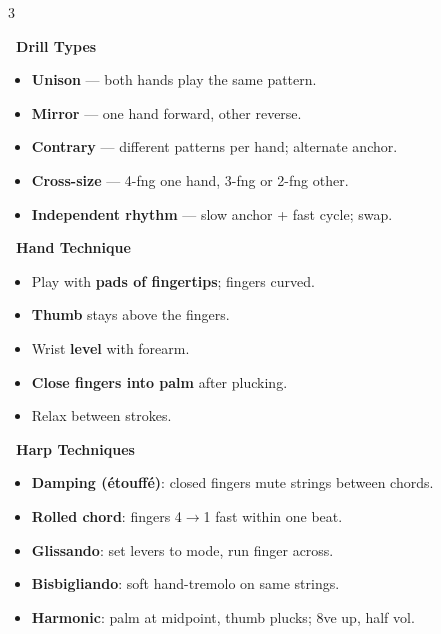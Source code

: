 \documentclass[letterpaper]{article}
\begin{document}
\vspace{3mm}

\fontsize{8.5}{10.5}\selectfont
\setlength{\columnsep}{3mm}
\begin{multicols}{3}

\colorbox{headerbg}{\color{white}\textbf{\ Drill Types\ }}
\vspace{1mm}
\begin{itemize}
\item \textbf{Unison} --- both hands play the same pattern.
\item \textbf{Mirror} --- one hand forward, other reverse.
\item \textbf{Contrary} --- different patterns per hand; alternate anchor.
\item \textbf{Cross-size} --- 4-fng one hand, 3-fng or 2-fng other.
\item \textbf{Independent rhythm} --- slow anchor + fast cycle; swap.
\end{itemize}

\vspace{1.5mm}
\colorbox{headerbg}{\color{white}\textbf{\ Hand Technique\ }}
\vspace{1mm}
\begin{itemize}
\item Play with \textbf{pads of fingertips}; fingers curved.
\item \textbf{Thumb} stays above the fingers.
\item Wrist \textbf{level} with forearm.
\item \textbf{Close fingers into palm} after plucking.
\item Relax between strokes.
\end{itemize}

\vspace{1.5mm}
\colorbox{headerbg}{\color{white}\textbf{\ Harp Techniques\ }}
\vspace{1mm}
\begin{itemize}
\item \textbf{Damping (étouffé)}: closed fingers mute strings between chords.
\item \textbf{Rolled chord}: fingers 4\(\to\)1 fast within one beat.
\item \textbf{Glissando}: set levers to mode, run finger across.
\item \textbf{Bisbigliando}: soft hand-tremolo on same strings.
\item \textbf{Harmonic}: palm at midpoint, thumb plucks; 8ve up, half vol.
\end{itemize}


\end{multicols}
\end{document}
